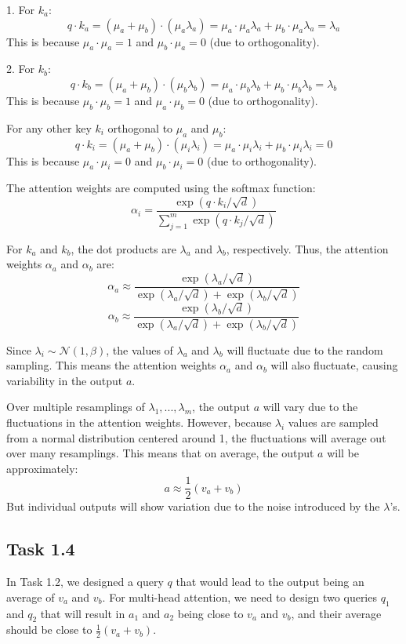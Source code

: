 \documentclass{article}
\begin{document}
1. For \( k_a \):
   \[
   q \cdot k_a = (\mu_a + \mu_b) \cdot (\mu_a \lambda_a) = \mu_a \cdot \mu_a \lambda_a + \mu_b \cdot \mu_a \lambda_a = \lambda_a
   \]
   This is because \( \mu_a \cdot \mu_a = 1 \) and \( \mu_b \cdot \mu_a = 0 \) (due to orthogonality).

2. For \( k_b \):
   \[
   q \cdot k_b = (\mu_a + \mu_b) \cdot (\mu_b \lambda_b) = \mu_a \cdot \mu_b \lambda_b + \mu_b \cdot \mu_b \lambda_b = \lambda_b
   \]
   This is because \( \mu_b \cdot \mu_b = 1 \) and \( \mu_a \cdot \mu_b = 0 \) (due to orthogonality).

For any other key \( k_i \) orthogonal to \( \mu_a \) and \( \mu_b \):
   \[
   q \cdot k_i = (\mu_a + \mu_b) \cdot (\mu_i \lambda_i) = \mu_a \cdot \mu_i \lambda_i + \mu_b \cdot \mu_i \lambda_i = 0
   \]
   This is because \( \mu_a \cdot \mu_i = 0 \) and \( \mu_b \cdot \mu_i = 0 \) (due to orthogonality).

The attention weights are computed using the softmax function:
   \[
   \alpha_i = \frac{\exp(q \cdot k_i / \sqrt{d})}{\sum_{j=1}^{m} \exp(q \cdot k_j / \sqrt{d})}
   \]

For \( k_a \) and \( k_b \), the dot products are \(\lambda_a\) and \(\lambda_b\), respectively. Thus, the attention weights \(\alpha_a\) and \(\alpha_b\) are:
   \[
   \alpha_a \approx \frac{\exp(\lambda_a / \sqrt{d})}{\exp(\lambda_a / \sqrt{d}) + \exp(\lambda_b / \sqrt{d})}
   \]
   \[
   \alpha_b \approx \frac{\exp(\lambda_b / \sqrt{d})}{\exp(\lambda_a / \sqrt{d}) + \exp(\lambda_b / \sqrt{d})}
   \]

Since \(\lambda_i \sim \mathcal{N}(1, \beta)\), the values of \(\lambda_a\) and \(\lambda_b\) will fluctuate due to the random sampling. This means the attention weights \(\alpha_a\) and \(\alpha_b\) will also fluctuate, causing variability in the output \(a\).

Over multiple resamplings of \(\lambda_1, ..., \lambda_m\), the output \(a\) will vary due to the fluctuations in the attention weights. However, because \(\lambda_i\) values are sampled from a normal distribution centered around 1, the fluctuations will average out over many resamplings. This means that on average, the output \(a\) will be approximately:
   \[
   a \approx \frac{1}{2}(v_a + v_b)
   \]
But individual outputs will show variation due to the noise introduced by the \(\lambda\)'s.

\subsection{Task 1.4}
In Task 1.2, we designed a query \( q \) that would lead to the output being an average of \( v_a \) and \( v_b \). For multi-head attention, we need to design two queries \( q_1 \) and \( q_2 \) that will result in \( a_1 \) and \( a_2 \) being close to \( v_a \) and \( v_b \), and their average should be close to \( \frac{1}{2}(v_a + v_b) \).
\end{document}

